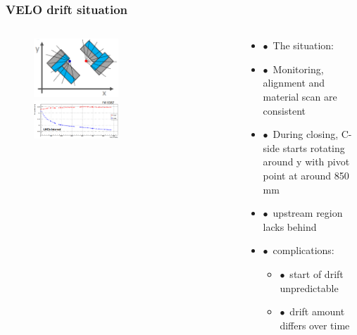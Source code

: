 \documentclass[aspectratio=1610, 12pt, xcolor=dvipsnames]{beamer}
\begin{document}
\begin{frame}\frametitle{VELO drift situation}
  \begin{columns}
    \begin{column}[c]{0.48\textwidth}
      \begin{figure}
        \includegraphics[width=0.5\textwidth]{plots/velo_axes.png}
        \includegraphics[width=0.5\textwidth]{plots/c_side_drift_freiss.png}
      \end{figure}
    \end{column}
    \begin{column}[c]{0.48\textwidth}
      \begin{itemize}
        \item $\bullet$\, The situation:
        \item $\bullet$\, Monitoring, alignment and material scan are consistent
        \item $\bullet$\, During closing, C-side starts rotating around y with pivot point at around 850 mm
        \item $\bullet$\, \to upstream region lacks behind
        \item $\bullet$\, complications:
        \begin{itemize}
          \item $\bullet$\, start of drift unpredictable
          \item $\bullet$\, drift amount differs over time
        \end{itemize}
      \end{itemize}
    \end{column}
  \end{columns}
\end{frame}
\end{document}
